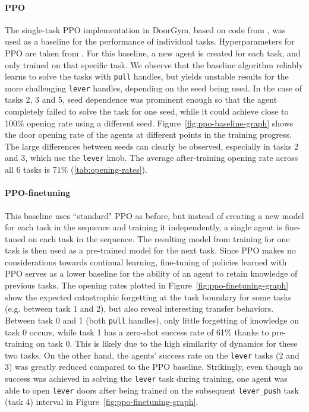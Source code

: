 \documentclass[dvipsnames]{article} %
\newcommand{\commentOLD}[1]{}
\newcommand{\saOLD}[1] {\commentOLD{{\color{cyan} SA: #1}}}                %
\newcommand{\asOLD}[1] {\commentOLD{{\color{orange} AS: #1}}}              %
\begin{document}
\paragraph{PPO} The single-task PPO implementation in DoorGym, based on code from \citet{pytorchrl}, was used as a baseline for the performance of individual tasks. Hyperparameters for PPO are taken from \cite{doorgym}. For this baseline, a new agent is created for each task, and only trained on that specific task. We observe that the baseline algorithm reliably learns to solve the tasks with \texttt{pull} handles, but yields unstable results for the more challenging \texttt{lever} handles, depending on the seed being used. In the case of tasks 2, 3 and 5, seed dependence was prominent enough so that the agent completely failed to solve the task for one seed, while it could achieve close to 100\% opening rate using a different seed. Figure~\ref{fig:ppo-baseline-graph} shows the door opening rate of the agents at different points in the training progress. The large differences between seeds can clearly be observed, especially in tasks 2 and 3, which use the \texttt{lever} knob. The average after-training opening rate across all 6 tasks is 71\% (\ref{tab:opening-rates}).
\saOLD{This is where a separate PPO agent is trained on each task, right? Make it more explicit.}


\paragraph{PPO-finetuning} This baseline uses ``standard" PPO as before, but instead of creating a new model for each task in the sequence and training it independently, a single agent is fine-tuned on each task in the sequence. The resulting model from training for one task is then used as a pre-trained model for the next task. Since PPO makes no considerations towards continual learning, fine-tuning of policies learned with PPO serves as a lower baseline for the ability of an agent to retain knowledge of previous tasks.
The opening rates plotted in Figure~\ref{fig:ppo-finetuning-graph} show the expected catastrophic forgetting at the task boundary for some tasks (e.g. between task 1 and 2), but also reveal interesting transfer behaviors. Between task 0 and 1 (both \texttt{pull} handles), only little forgetting of knowledge on task 0 occurs, while task 1 has a zero-shot success rate of 61\% thanks to pre-training on task 0. This is likely due to the high similarity of dynamics for these two tasks. On the other hand, the agents' success rate on the \texttt{lever} tasks (2 and 3) was greatly reduced compared to the PPO baseline. Strikingly, even though no success was achieved in solving the \texttt{lever} task during training, one agent was able to open \texttt{lever} doors after being trained on the subsequent \texttt{lever\_push} task (task 4)\asOLD{be consistent with the task fornts. Also I do not know what those numbers refer to in the figure} interval in Figure~\ref{fig:ppo-finetuning-graph}.
\end{document}
